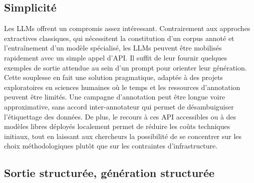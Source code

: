 \subsection{Simplicité}

Les LLMs offrent un compromis assez intéressant. Contrairement aux approches extractives classiques, qui nécessitent la constitution d’un corpus annoté et l’entraînement d’un modèle spécialisé, les LLMs peuvent être mobilisés rapidement avec un simple appel d'API. Il suffit de leur fournir quelques exemples de sortie attendue au sein d’un prompt pour orienter leur génération. Cette souplesse en fait une solution pragmatique, adaptée à des projets exploratoires en sciences humaines où le temps et les ressources d’annotation peuvent être limités. Une campagne d'annotation peut être longue voire approximative, sans accord inter-annotateur qui permet de désambuiguiser l'étiquettage des données. De plus, le recours à ces API accessibles ou à des modèles libres déployés localement permet de réduire les coûts techniques initiaux, tout en laissant aux chercheurs la possibilité de se concentrer sur les choix méthodologiques plutôt que sur les contraintes d’infrastructure. 

\subsection{Sortie structurée, génération structurée}

